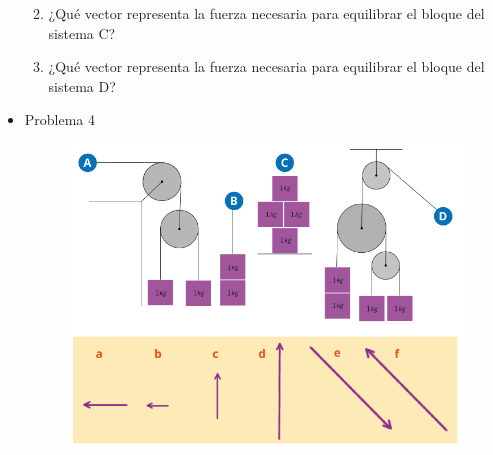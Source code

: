 \documentclass[11pt]{book}
\begin{document}
\begin{itemize}
\begin{boxK}
\begin{enumerate}
\begin{hoptboxes}
                        \end{hoptboxes}
                  \item ¿Qué vector representa la fuerza necesaria para equilibrar el bloque
                        del sistema C?\\
                  \item ¿Qué vector representa la fuerza necesaria para equilibrar el bloque
                        del sistema D?\\
              \end{enumerate}
          \end{boxK}
          \newpage
    \item Problema 4
          \begin{boxK}
              \begin{figure}[H]
                  \centering
                  \includegraphics[width=0.9\linewidth]{poleas03.png}

\end{figure}
\end{boxK}
\end{itemize}
\end{document}
